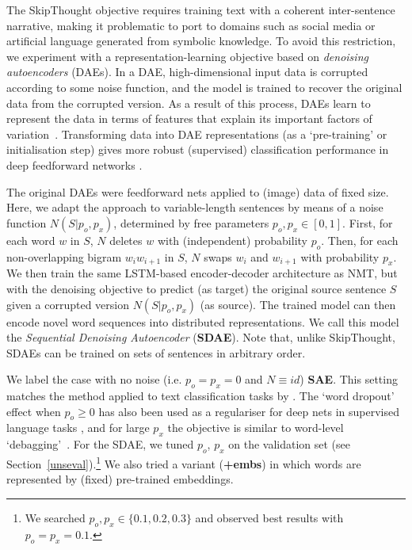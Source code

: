 \vspace{5pt} The SkipThought objective requires training text with a coherent inter-sentence narrative, making it problematic to port to domains such as social media or artificial language generated from symbolic knowledge. To avoid this restriction, we experiment with a representation-learning objective based on \emph{denoising autoencoders} (DAEs). In a DAE, high-dimensional input data is corrupted according to some noise function, and the model is trained to recover the original data from the corrupted version. As a result of this process, DAEs learn to represent the data in terms of features that explain its important factors of variation~\cite{vincent2008extracting}. Transforming data into DAE representations (as a `pre-training' or initialisation step) gives more robust (supervised) classification performance in deep feedforward networks \cite{vincent2010stacked}.

The original DAEs were feedforward nets applied to (image) data of fixed size. Here, we adapt the approach to variable-length sentences by means of a noise function \(N(S | p_o,p_x)\), determined by free parameters \(p_o,p_x \in [0,1]\). First, for each word \(w\) in \(S\), \(N\) deletes \(w\) with (independent) probability \(p_o\). Then, for each non-overlapping bigram \(w_i w_{i+1}\) in \(S\), \(N\) swaps \(w_i\) and \(w_{i+1}\) with probability \(p_x\). We then train the same LSTM-based encoder-decoder architecture as NMT, but with the denoising objective to predict (as target) the original source sentence \(S\) given a corrupted version \(N(S |p_o,p_x)\) (as source). The trained model can then encode novel word sequences into distributed representations. We call this model the \emph{Sequential Denoising Autoencoder} ({\bf SDAE}). Note that, unlike SkipThought, SDAEs can be trained on sets of sentences in arbitrary order.   

We label the case with no noise (i.e. \(p_o = p_x = 0\) and \(N \equiv id\)) {\bf SAE}. This setting matches the method applied to text classification tasks by \cite{dai2015semi}. The `word dropout' effect when \(p_o \geq 0\) has also been used as a regulariser for deep nets in supervised language tasks \cite{iyyer2015deep}, and for large \(p_x\) the objective is similar to word-level `debagging'~\cite{sutskever2011generating}. For the SDAE, we tuned \(p_o\), \(p_x\) on the validation set (see Section~\ref{unseval}).\footnote{We searched \(p_o,p_x \in \{0.1,0.2,0.3\}\) and observed best results with \(p_o = p_x = 0.1\).} We also tried a variant ({\bf +embs}) in which words are represented by (fixed) pre-trained embeddings. 

